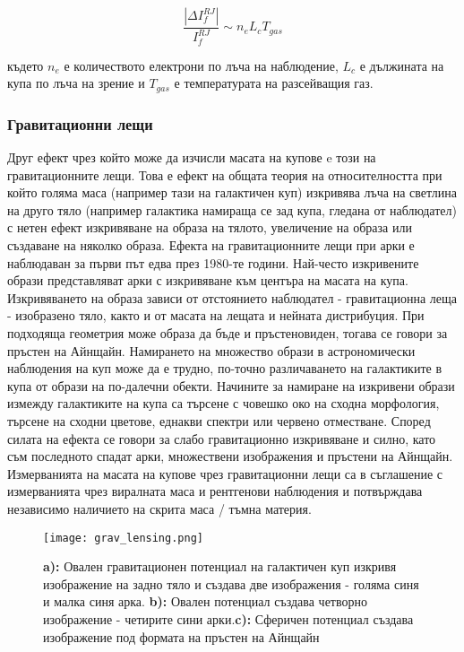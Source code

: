 \documentclass[a4paper,12pt]{article}
\begin{document}
\begin{equation}
    \frac{|\Delta I_f^{RJ}|}{I_f^{RJ}} \sim n_e L_c T_{gas}
\end{equation}

където $n_e$ е количеството електрони по лъча на наблюдение, $L_c$ е дължината на купа по лъча на зрение и $T_{gas}$ е температурата на разсейващия газ.


\subsubsection{Гравитационни лещи}
Друг ефект чрез който може да изчисли масата на купове e този на гравитационните лещи. Това е ефект на общата теория на относителността при който голяма маса (например тази на галактичен куп) изкривява лъча на светлина на друго тяло (например галактика намираща се зад купа, гледана от наблюдател) с нетен ефект изкривяване на образа на тялото, увеличение на образа или създаване на няколко образа. Ефекта на гравитационните лещи при арки е наблюдаван за първи път едва през 1980-те години. Най-често изкривените образи представляват арки с изкривяване към центъра на масата на купа. Изкривяването на образа зависи от отстоянието наблюдател - гравитационна леща - изобразено тяло, както и от масата на лещата и нейната дистрибуция. При подходяща геометрия може образа да бъде и пръстеновиден, тогава се говори за пръстен на Айнщайн. Намирането на множество образи в астрономически наблюдения на куп може да е трудно, по-точно различаването на галактиките в купа от образи на по-далечни обекти. Начините за намиране на изкривени образи измежду галактиките на купа са търсене с човешко око на сходна морфология, търсене на сходни цветове, еднакви спектри или червено отместване. Според силата на ефекта се говори за слабо гравитационно изкривяване и силно, като съм последното спадат арки, множествени изображения и пръстени на Айнщайн. Измерванията на масата на купове чрез гравитационни лещи са в съглашение с измерванията чрез виралната маса и рентгенови наблюдения и потвърждава независимо наличието на скрита маса / тъмна материя.

\begin{figure}[h!] %
\centering
\texttt{[image: grav\_lensing.png]}
\caption{\textbf{a):} Овален гравитационен потенциал на галактичен куп изкривя изображение на задно тяло и създава две изображения - голяма синя и малка синя арка. \textbf{b):} Овален потенциал създава четворно изображение - четирите сини арки.\textbf{c):} Сферичен потенциал създава изображение под формата на пръстен на Айнщайн}
\label{fig:grav_lensing}
\end{figure}
\end{document}
